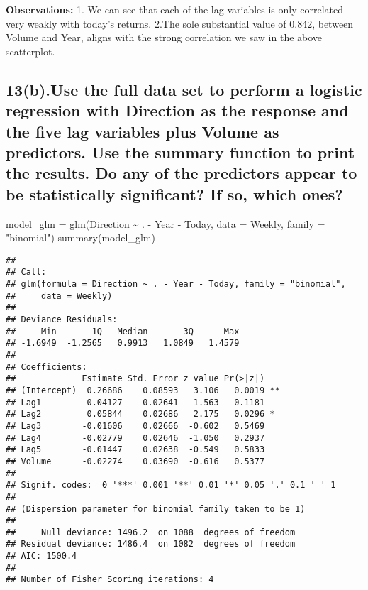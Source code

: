 \documentclass[
]{article}
\newenvironment{Shaded}{\begin{snugshade}}{\end{snugshade}}
\newcommand{\AttributeTok}[1]{\textcolor[rgb]{0.77,0.63,0.00}{#1}}
\newcommand{\FunctionTok}[1]{\textcolor[rgb]{0.00,0.00,0.00}{#1}}
\newcommand{\NormalTok}[1]{#1}
\newcommand{\OtherTok}[1]{\textcolor[rgb]{0.56,0.35,0.01}{#1}}
\newcommand{\SpecialCharTok}[1]{\textcolor[rgb]{0.00,0.00,0.00}{#1}}
\newcommand{\StringTok}[1]{\textcolor[rgb]{0.31,0.60,0.02}{#1}}
\begin{document}
\textbf{Observations:} 1. We can see that each of the lag variables is
only correlated very weakly with today's returns. 2.The sole substantial
value of 0.842, between Volume and Year, aligns with the strong
correlation we saw in the above scatterplot.

\hypertarget{b.use-the-full-data-set-to-perform-a-logistic-regression-with-direction-as-the-response-and-the-five-lag-variables-plus-volume-as-predictors.-use-the-summary-function-to-print-the-results.-do-any-of-the-predictors-appear-to-be-statistically-significant-if-so-which-ones}{%
\subsection{13(b).Use the full data set to perform a logistic regression
with Direction as the response and the five lag variables plus Volume as
predictors. Use the summary function to print the results. Do any of the
predictors appear to be statistically significant? If so, which
ones?}\label{b.use-the-full-data-set-to-perform-a-logistic-regression-with-direction-as-the-response-and-the-five-lag-variables-plus-volume-as-predictors.-use-the-summary-function-to-print-the-results.-do-any-of-the-predictors-appear-to-be-statistically-significant-if-so-which-ones}}

\begin{Shaded}
\begin{Highlighting}[]
\NormalTok{model\_glm }\OtherTok{=} \FunctionTok{glm}\NormalTok{(Direction }\SpecialCharTok{\textasciitilde{}}\NormalTok{ . }\SpecialCharTok{{-}}\NormalTok{ Year }\SpecialCharTok{{-}}\NormalTok{ Today, }\AttributeTok{data =}\NormalTok{ Weekly, }\AttributeTok{family =} \StringTok{"binomial"}\NormalTok{)}
\FunctionTok{summary}\NormalTok{(model\_glm)}
\end{Highlighting}
\end{Shaded}

\begin{verbatim}
## 
## Call:
## glm(formula = Direction ~ . - Year - Today, family = "binomial", 
##     data = Weekly)
## 
## Deviance Residuals: 
##     Min       1Q   Median       3Q      Max  
## -1.6949  -1.2565   0.9913   1.0849   1.4579  
## 
## Coefficients:
##             Estimate Std. Error z value Pr(>|z|)   
## (Intercept)  0.26686    0.08593   3.106   0.0019 **
## Lag1        -0.04127    0.02641  -1.563   0.1181   
## Lag2         0.05844    0.02686   2.175   0.0296 * 
## Lag3        -0.01606    0.02666  -0.602   0.5469   
## Lag4        -0.02779    0.02646  -1.050   0.2937   
## Lag5        -0.01447    0.02638  -0.549   0.5833   
## Volume      -0.02274    0.03690  -0.616   0.5377   
## ---
## Signif. codes:  0 '***' 0.001 '**' 0.01 '*' 0.05 '.' 0.1 ' ' 1
## 
## (Dispersion parameter for binomial family taken to be 1)
## 
##     Null deviance: 1496.2  on 1088  degrees of freedom
## Residual deviance: 1486.4  on 1082  degrees of freedom
## AIC: 1500.4
## 
## Number of Fisher Scoring iterations: 4
\end{verbatim}
\end{document}
